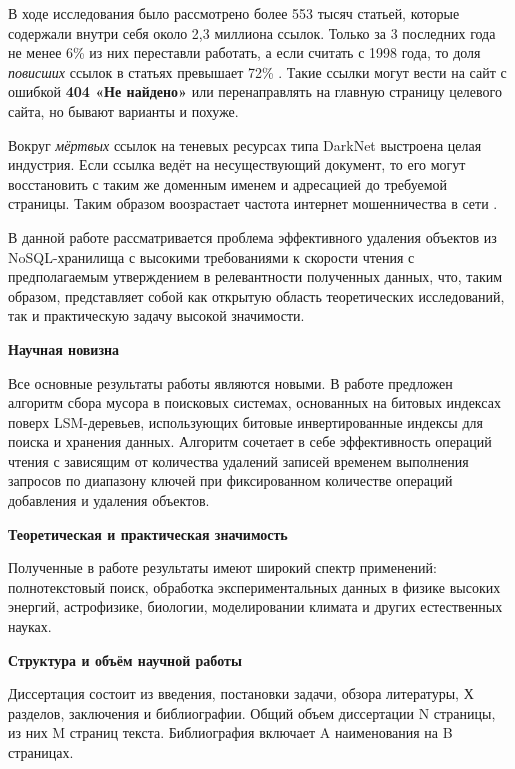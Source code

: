 В ходе исследования было рассмотрено более 553 тысяч статьей, которые содержали
внутри себя около 2,3 миллиона ссылок. Только за 3 последних года не менее 6\%
из них переставли работать, а если считать с 1998 года, то доля \textit{повисших}
ссылок в статьях превышает 72\% \cite{NYT}. Такие ссылки могут вести на сайт с
ошибкой \textbf{404 «Не найдено»} или перенаправлять на главную страницу целевого
сайта, но бывают варианты и похуже.

Вокруг \textit{мёртвых} ссылок на теневых ресурсах типа DarkNet выстроена целая
индустрия. Если ссылка ведёт на несуществующий документ, то его могут восстановить
с таким же доменным именем и адресацией до требуемой страницы. Таким образом
воозрастает частота интернет мошенничества в сети \cite{Fraud}.

В данной работе рассматривается проблема эффективного удаления объектов из
NoSQL-хранилища с высокими требованиями к скорости чтения с предполагаемым
утверждением в релевантности полученных данных, что, таким образом, представляет
собой как открытую область теоретических исследований, так и практическую задачу
высокой значимости.

\textbf{Научная новизна}

Все основные результаты работы являются новыми. В работе предложен алгоритм
сбора мусора в поисковых системах, основанных на битовых индексах
поверх LSM-деревьев, использующих битовые инвертированные индексы для поиска и
хранения данных. Алгоритм сочетает в себе эффективность операций чтения с
зависящим от количества удалений записей временем выполнения запросов по
диапазону ключей при фиксированном количестве операций добавления и удаления
объектов.

\textbf{Теоретическая и практическая значимость}

Полученные в работе результаты имеют широкий спектр применений: полнотекстовый поиск,
обработка экспериментальных данных в физике высоких энергий, астрофизике, биологии,
моделировании климата и других естественных науках.

\textbf{Структура и объём научной работы}

Диссертация состоит из введения, постановки задачи, обзора литературы, Х
разделов, заключения и библиографии. Общий объем диссертации N страницы, из
них M страниц текста. Библиография включает A наименования на B страницах.
